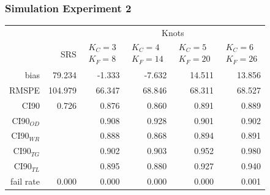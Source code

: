 \documentclass[mathserif,compress]{beamer}\usepackage{graphicx, color}
\begin{document}
\begin{frame}[fragile]
\frametitle{Simulation Experiment 2}

\footnotesize
\begin{table}[ht]
\centering
\begin{tabular}{rrrrrr}
  \hline
  \hline
	&  & \multicolumn{4}{c}{Knots} \\ 
 & SRS & $\begin{array}{c}K_C=3  \\ K_F=8 \end{array}$ & $\begin{array}{c}K_C=4  \\ K_F=14 \end{array}$ & $\begin{array}{c}K_C=5  \\ K_F=20 \end{array}$ & $\begin{array}{c}K_C=6  \\ K_F=26 \end{array}$ \\
  \hline
bias & 79.234 & -1.333 & -7.632 & 14.511 & 13.856 \\ 
  RMSPE & 104.979 & 66.347 & 68.846 & 68.311 & 68.527 \\ 
  CI90 & 0.726 & 0.876 & 0.860 & 0.891 & 0.889 \\ 
  CI90$_{OD}$ &  & 0.908 & 0.928 & 0.901 & 0.902 \\ 
  CI90$_{WR}$ &  & 0.888 & 0.868 & 0.894 & 0.891 \\ 
  CI90$_{TG}$ &  & 0.902 & 0.903 & 0.952 & 0.980 \\ 
  CI90$_{TL}$ &  & 0.895 & 0.880 & 0.927 & 0.940 \\ 
  fail rate & 0.000 & 0.000 & 0.000 & 0.000 & 0.001 \\ 
  \hline
   \hline
\end{tabular}
\end{table}

\end{frame}

\end{document}
